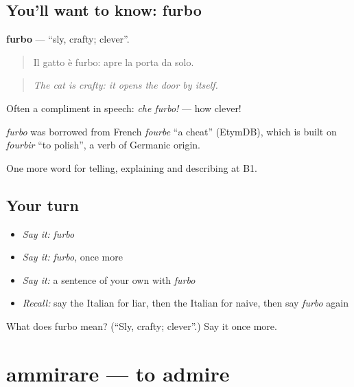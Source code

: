 \subsection*{You'll want to know: furbo}
\textbf{furbo} — \textquotedblleft{}sly, crafty; clever\textquotedblright{}.

\begin{quote}
Il gatto è furbo: apre la porta da solo.
\end{quote}

\begin{quote}
\emph{The cat is crafty: it opens the door by itself.}
\end{quote}

Often a compliment in speech: \emph{che furbo!} — how clever!

\begin{cousinweb}
\emph{furbo} was borrowed from French \emph{fourbe} \textquotedblleft{}a cheat\textquotedblright{} (EtymDB), which is built on \emph{fourbir} \textquotedblleft{}to polish\textquotedblright{}, a verb of Germanic origin.
\end{cousinweb}

\begin{grammarlens}[title={What you've built}]
One more word for telling, explaining and describing at B1.
\end{grammarlens}

\subsection*{Your turn}
\begin{itemize}
\raggedright
  \item \emph{Say it:} \emph{furbo}
  \item \emph{Say it:} \emph{furbo}, once more
  \item \emph{Say it:} a sentence of your own with \emph{furbo}
  \item \emph{Recall:} say the Italian for liar, then the Italian for naive, then say \emph{furbo} again
\end{itemize}

\begin{tcolorbox}[breakable,colback=teal!4,colframe=teal!35!black,title={Before you move on}]
What does furbo mean? (\textquotedblleft{}Sly, crafty; clever\textquotedblright{}.) Say it once more.
\end{tcolorbox}
\section[ammirare]{ammirare — to admire}

